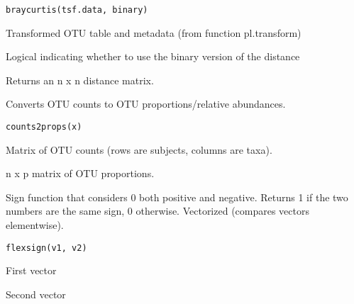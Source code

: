 \documentclass[a4paper]{book}
\begin{document}
%
\begin{Usage}
\begin{verbatim}
braycurtis(tsf.data, binary)
\end{verbatim}
\end{Usage}
%
\begin{Arguments}
\begin{ldescription}
\item[\code{tsf.data}] Transformed OTU table and metadata (from function pl.transform)

\item[\code{binary}] Logical indicating whether to use the binary version of the distance
\end{ldescription}
\end{Arguments}
%
\begin{Value}
Returns an n x n distance matrix.
\end{Value}
%
\begin{Description}\relax
Converts OTU counts to OTU proportions/relative abundances.
\end{Description}
%
\begin{Usage}
\begin{verbatim}
counts2props(x)
\end{verbatim}
\end{Usage}
%
\begin{Arguments}
\begin{ldescription}
\item[\code{x}] Matrix of OTU counts (rows are subjects, columns are taxa).
\end{ldescription}
\end{Arguments}
%
\begin{Value}
n x p matrix of OTU proportions.
\end{Value}
%
\begin{Description}\relax
Sign function that considers 0 both positive and negative. Returns 1 if the two numbers are the same sign, 0 otherwise. Vectorized (compares vectors elementwise).
\end{Description}
%
\begin{Usage}
\begin{verbatim}
flexsign(v1, v2)
\end{verbatim}
\end{Usage}
%
\begin{Arguments}
\begin{ldescription}
\item[\code{v1}] First vector

\item[\code{v2}] Second vector
\end{ldescription}
\end{Arguments}
\end{document}
